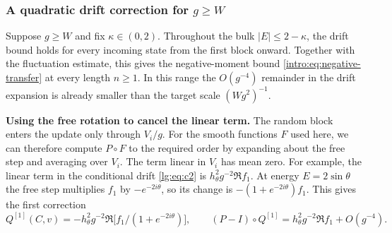 \documentclass[11pt]{article}
\numberwithin{equation}{section}
\theoremstyle{remark}
\begin{document}
\subsubsection{A quadratic drift correction for \texorpdfstring{$g\ge W$}{g at least W}}

Suppose $g\ge W$ and fix $\kappa\in(0,2)$. Throughout the bulk
$|E|\le 2-\kappa$, the drift bound holds for every incoming state
from the first block onward. Together with the fluctuation estimate, this gives
the negative-moment bound \eqref{intro:eq:negative-transfer} at every
length $n\ge1$. In this range the $O(g^{-4})$ remainder in the drift
expansion is already smaller than the target scale $(Wg^2)^{-1}$.

\medskip\noindent\textbf{Using the free rotation to cancel the linear term.}
The random block enters the update only through $V_i/g$. For the
smooth functions $F$ used here, we can therefore compute $P\circ F$
to the required order by expanding about the free step and averaging
over $V_i$. The term linear in $V_i$ has mean zero.
For example, the linear term in the conditional drift \eqref{lg:eq:c2}
is $h_\theta^2g^{-2}\Re f_1$. At energy $E=2\sin\theta$ the free step
multiplies $f_1$ by $-e^{-2i\theta}$, so its change is
$-(1+e^{-2i\theta})f_1$. This gives the first correction
\[
 Q^{[1]}(C,v)=-h_\theta^2g^{-2}\Re\bigl[f_1/(1+e^{-2i\theta})\bigr],\qquad
 (P-I)\circ Q^{[1]}=h_\theta^2g^{-2}\Re f_1+O(g^{-4}).
\]
 
\end{document}
